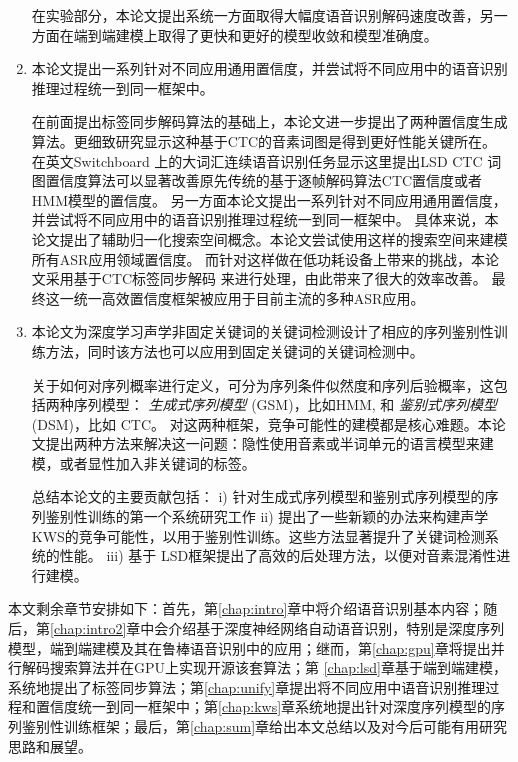 \begin{enumerate}
在实验部分，本论文提出系统一方面取得大幅度语音识别解码速度改善，另一方面在端到端建模上取得了更快和更好的模型收敛和模型准确度。

\item 本论文提出一系列针对不同应用通用置信度，并尝试将不同应用中的语音识别推理过程统一到同一框架中。

在前面提出标签同步解码算法的基础上，本论文进一步提出了两种置信度生成算法。更细致研究显示这种基于CTC的音素词图是得到更好性能关键所在。
在英文Switchboard 上的大词汇连续语音识别任务显示这里提出LSD CTC 词图置信度算法可以显著改善原先传统的基于逐帧解码算法CTC置信度或者 HMM模型的置信度。
%
另一方面本论文提出一系列针对不同应用通用置信度，并尝试将不同应用中的语音识别推理过程统一到同一框架中。
%
具体来说，本论文提出了辅助归一化搜索空间概念。本论文尝试使用这样的搜索空间来建模所有ASR应用领域置信度。 %
而针对这样做在低功耗设备上带来的挑战，本论文采用基于CTC标签同步解码\cite{Chen+2016} 来进行处理，由此带来了很大的效率改善。
最终这一统一高效置信度框架被应用于目前主流的多种ASR应用。

\item 
本论文为深度学习声学非固定关键词的关键词检测设计了相应的序列鉴别性训练方法，同时该方法也可以应用到固定关键词的关键词检测中。

关于如何对序列概率进行定义，可分为序列条件似然度和序列后验概率，这包括两种序列模型： {\em 生成式序列模型} (GSM)，比如HMM, 和 {\em 鉴别式序列模型} (DSM)，比如 CTC。
对这两种框架，竞争可能性的建模都是核心难题。本论文提出两种方法来解决这一问题：隐性使用音素或半词单元的语言模型来建模，或者显性加入非关键词的标签。

总结本论文的主要贡献包括：
i) 针对生成式序列模型和鉴别式序列模型的序列鉴别性训练的第一个系统研究工作
ii) 提出了一些新颖的办法来构建声学KWS的竞争可能性，以用于鉴别性训练。这些方法显著提升了关键词检测系统的性能。
iii) 基于 LSD框架提出了高效的后处理方法，以便对音素混淆性进行建模。
\end{enumerate}

本文剩余章节安排如下：首先，第\ref{chap:intro}章中将介绍语音识别基本内容；随后，第\ref{chap:intro2}章中会介绍基于深度神经网络自动语音识别，特别是深度序列模型，端到端建模及其在鲁棒语音识别中的应用；继而，第\ref{chap:gpu}章将提出并行解码搜索算法并在GPU上实现开源该套算法；第
\ref{chap:lsd}章基于端到端建模，系统地提出了标签同步算法；第\ref{chap:unify}章提出将不同应用中语音识别推理过程和置信度统一到同一框架中；第\ref{chap:kws}章系统地提出针对深度序列模型的序列鉴别性训练框架；最后，第\ref{chap:sum}章给出本文总结以及对今后可能有用研究思路和展望。
